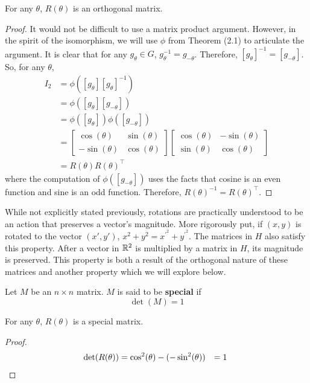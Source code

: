 \begin{theorem}
	For any $\theta$, $R(\theta)$ is an orthogonal matrix.
\end{theorem}
\noindent\begin{proof} It would not be difficult to use a matrix product argument. However, in the spirit of the isomorphism, we will use $\phi$ from Theorem (2.1) to articulate the argument. It is clear that for any $g_\theta \in G$, $g_\theta^{-1} = g_{-\theta}$. Therefore, $[g_\theta]^{-1} = [g_{-\theta}]$. So, for any $\theta$, 
\begin{equation}
	\begin{aligned}
		I_2 &= \phi([g_\theta][g_\theta]^{-1})\\
		 &= \phi([g_\theta][g_{-\theta}]) \\ 
		 &= \phi([g_\theta])\phi([g_{-\theta}])\\
		 &= \begin{bmatrix}
			\cos(\theta) & \sin(\theta) \\
			-\sin(\theta) & \cos(\theta)
		\end{bmatrix}
\begin{bmatrix}
			\cos(\theta) & -\sin(\theta) \\
			\sin(\theta) & \cos(\theta)
		\end{bmatrix}\\
		 &= R(\theta)R(\theta)^\intercal
	\end{aligned}
\end{equation}
where the computation of $\phi([g_{-\theta}])$ uses the facts that cosine is an even function and sine is an odd function. Therefore, $R(\theta)^{-1} = R(\theta)^\intercal$. \end{proof}

While not explicitly stated previously, rotations are practically understood to be an action that preserves a vector's magnitude. More rigorously put, if $(x,y)$ is rotated to the vector $(x',y')$, $x^2+y^2 = x^{\prime^2}+y^{\prime^2}$. The matrices in $H$ also satisfy this property. After a vector in $\mathbb{R}^2$ is multiplied by a matrix in $H$, its magnitude is preserved. This property is both a result of the orthogonal nature of these matrices and another property which we will explore below.

\begin{definition}
	Let $M$ be an $n\times n$ matrix. $M$ is said to be \textbf{special} if $$\det(M)=1$$
\end{definition}

\begin{theorem}
	For any $\theta$, $R(\theta)$ is a special matrix.
\end{theorem}
\noindent\begin{proof}
\begin{equation}
	\begin{aligned}
		\det(R(\theta)) &= \cos^2(\theta) - (-\sin^2(\theta)) &= 1 \hspace{1mm} 
	\end{aligned}
\end{equation}
\end{proof}

